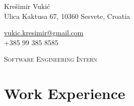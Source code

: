 \documentclass[a4paper,10pt]{article} %
\begin{document}
\pagestyle{empty} %



\begin{minipage}{.5\textwidth}
\LARGE{Krešimir Vukić}\\
\normalsize{Ulica Kaktusa 67, 10360 Sesvete, Croatia}
\end{minipage}%
\begin{minipage}{.5\textwidth}
\raggedleft
\href{mailto:vukic.kresimir@gmail.com}{vukic.kresimir@gmail.com} \\
+385 99 385 8585 \\
\end{minipage}

\vspace{5mm}


\begin{center}
\textsc{\large{Software Engineering Intern}}
\end{center}

\vspace{2mm}

\section{Work Experience}
\end{document}
